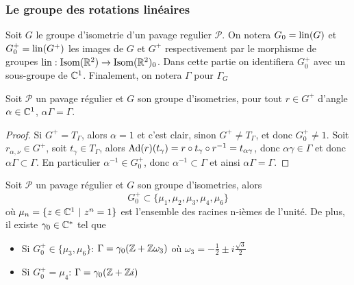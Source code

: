 \subsubsection{Le groupe des rotations linéaires}

\begin{notation}
	Soit $G$ le groupe d'isometrie d'un pavage regulier $\mathcal{P}$. On notera
	$G_0 = \operatorname{lin}(G)$ et $G_0^+ = \operatorname{lin}(G^+)$ les images de $G$ et $G^+$
	respectivement par le morphisme de groupes
	$\operatorname{lin}: \operatorname{Isom}(\mathbb{R}^2) \to \operatorname{Isom}(\mathbb{R}^2)_0$.
	Dans cette partie on identifiera $G_0^+$ avec un sous-groupe de $\mathbb{C}^1$.
	Finalement, on notera $\Gamma$ pour $\Gamma_G$
\end{notation}

\begin{lemma}
	\label{lem:invariance-rotation}
	Soit $\mathcal{P}$ un pavage régulier et $G$ son groupe d'isometries, pour
	tout $r \in G^+$ d'angle $\alpha \in \mathbb{C}^1$, $\alpha\Gamma = \Gamma$.
\end{lemma}

\begin{proof}
	Si $G^+ = T_\Gamma$, alors $\alpha = 1$ et c'est clair,
	sinon $G^+ \neq T_\Gamma$, et donc $G_0^+ \neq {1}$.
	Soit $r_{\alpha, \nu} \in G^+$, soit $t_\gamma \in T_\Gamma$, alors
	$\operatorname{Ad}(r)(t_\gamma) = r \circ t_\gamma \circ r^{-1} = t_{\alpha\gamma}$,
	donc $\alpha\gamma \in \Gamma$ et donc $\alpha\Gamma \subset \Gamma$.
	En particulier $\alpha^{-1} \in G_0^+$, donc $\alpha^{-1} \subset \Gamma$
	et ainsi $\alpha \Gamma = \Gamma$.
\end{proof}

\begin{theorem}
	\label{thn:pavage-rotations}
	Soit $\mathcal{P}$ un pavage régulier et $G$ son groupe d'isometries,
	alors 
	\begin{equation*}
		G_0^+ \subset \{\mu_1, \mu_2, \mu_3, \mu_4, \mu_6\}
	\end{equation*}
	où $\mu_n = \{z \in \mathbb{C}^1\ |\ z^n = 1\}$ est l'ensemble des racines n-ièmes de
	l'unité. De plus, il existe $\gamma_0 \in \mathbb{C}^*$ tel que
	\begin{itemize}
		\item Si $G_0^+ \in \{\mu_3, \mu_6\}$: $\Gamma = \gamma_0(\mathbb{Z} + \mathbb{Z}\omega_3)$
			où $\omega_3 = -\frac{1}{2} \pm i \frac{\sqrt{3}}{2}$
		\item Si $G_0^+ = \mu_ 4$: $\Gamma = \gamma_0(\mathbb{Z} + \mathbb{Z} i)$
	\end{itemize}
\end{theorem}

